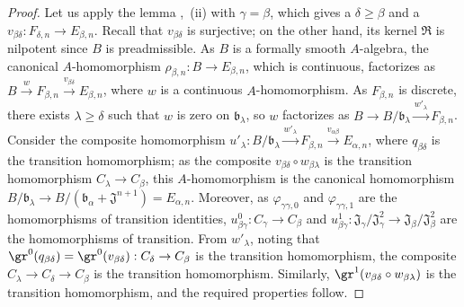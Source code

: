 \begin{proof}
Let us apply the lemma ,~(ii) with $\gamma=\beta$, which gives a $\delta\geq\beta$ and a $v_{\beta\delta}:F_{\delta,n}\to E_{\beta,n}$.
Recall that $v_{\beta\delta}$ is surjective;
on the other hand, its kernel $\mathfrak{R}$ is nilpotent since $B$ is preadmissible.
As $B$ is a formally smooth $A$-algebra, the canonical $A$-homomorphism $\rho_{\beta,n}:B\to E_{\beta,n}$, which is continuous, factorizes as $B\xrightarrow{w}F_{\beta,n}\xrightarrow{v_{\beta\delta}}E_{\beta,n}$, where $w$ is a continuous $A$-homomorphism.
As $F_{\beta,n}$ is discrete, there exists $\lambda\geq\delta$ such that $w$ is zero on $\mathfrak{b}_\lambda$, so $w$ factorizes as $B\to B/\mathfrak{b}_\lambda\xrightarrow{w'_\lambda}F_{\beta,n}$.
Consider the composite homomorphism $u'_\lambda:B/\mathfrak{b}_\lambda\xrightarrow{w'_\lambda}F_{\beta,n}\xrightarrow{v_{\alpha\beta}}E_{\alpha,n}$, where $q_{\beta\delta}$ is the transition homomorphism;
as the composite $v_{\beta\delta}\circ w_{\beta\lambda}$ is the transition homomorphism $C_\lambda\to C_\beta$, this $A$-homomorphism is the canonical homomorphism $B/\mathfrak{b}_\lambda\to B/(\mathfrak{b}_\alpha+\mathfrak{J}^{n+1})=E_{\alpha,n}$.
Moreover, as $\varphi_{\gamma\gamma,0}$ and $\varphi_{\gamma\gamma,1}$ are the homomorphisms of transition identities, $u^0_{\beta\gamma}:C_\gamma\to C_\beta$ and $u^1_{\beta\gamma}:\mathfrak{J}_\gamma/\mathfrak{J}_\gamma^2\to\mathfrak{J}_\beta/\mathfrak{J}_\beta^2$ are the homomorphisms of transition.
From $w'_\lambda$, noting that $\gr^0(q_{\beta\delta})=\gr^0(v_{\beta\delta}):C_\delta\to C_\beta$ is the transition homomorphism, the composite $C_\lambda\to C_\delta\to C_\beta$ is the transition homomorphism.
Similarly, $\gr^1(v_{\beta\delta}\circ w_{\beta\lambda})$ is the transition homomorphism, and the required properties follow.
\end{proof}

